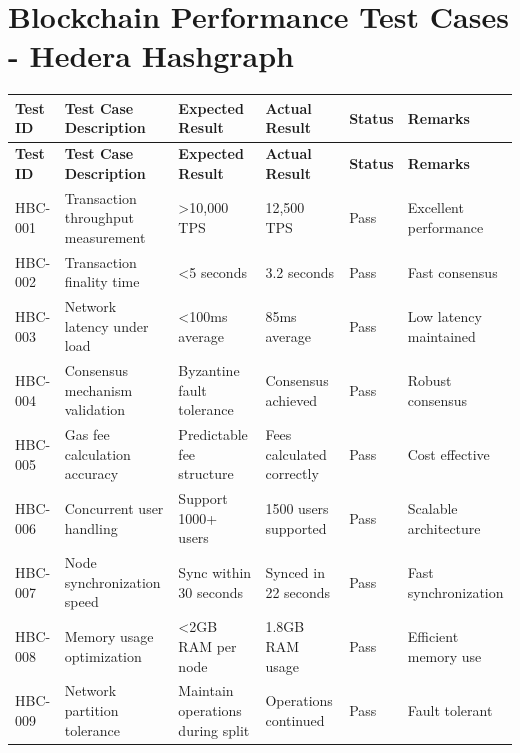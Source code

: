 \documentclass[oneside,a4paper,12pt]{book}
\begin{document}
\section{Blockchain Performance Test Cases - Hedera Hashgraph}
\begin{longtable}{|p{1.2cm}|p{3cm}|p{2.3cm}|p{2.3cm}|p{1.5cm}|p{2cm}|}
\hline
\textbf{Test ID} & \textbf{Test Case Description} & \textbf{Expected Result} & \textbf{Actual Result} & \textbf{Status} & \textbf{Remarks} \\
\hline
\endfirsthead

\hline
\textbf{Test ID} & \textbf{Test Case Description} & \textbf{Expected Result} & \textbf{Actual Result} & \textbf{Status} & \textbf{Remarks} \\
\hline
\endhead

HBC-001 & Transaction throughput measurement & >10,000 TPS & 12,500 TPS & Pass & Excellent performance \\
\hline

HBC-002 & Transaction finality time & <5 seconds & 3.2 seconds & Pass & Fast consensus \\
\hline

HBC-003 & Network latency under load & <100ms average & 85ms average & Pass & Low latency maintained \\
\hline

HBC-004 & Consensus mechanism validation & Byzantine fault tolerance & Consensus achieved & Pass & Robust consensus \\
\hline

HBC-005 & Gas fee calculation accuracy & Predictable fee structure & Fees calculated correctly & Pass & Cost effective \\
\hline

HBC-006 & Concurrent user handling & Support 1000+ users & 1500 users supported & Pass & Scalable architecture \\
\hline

HBC-007 & Node synchronization speed & Sync within 30 seconds & Synced in 22 seconds & Pass & Fast synchronization \\
\hline

HBC-008 & Memory usage optimization & <2GB RAM per node & 1.8GB RAM usage & Pass & Efficient memory use \\
\hline

HBC-009 & Network partition tolerance & Maintain operations during split & Operations continued & Pass & Fault tolerant \\
\hline


\end{longtable}
\end{document}
